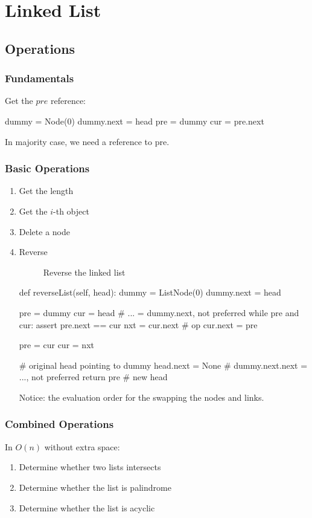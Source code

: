 \chapter{Linked List}


\section{Operations}
\subsection{Fundamentals}
Get the $pre$ reference:
\begin{python}
dummy = Node(0)
dummy.next = head
pre = dummy
cur = pre.next
\end{python}

In majority case, we need a reference to pre.

\subsection{Basic Operations}
\begin{enumerate}
\item Get the length
\item Get the $i$-th object
\item Delete a node 
\item Reverse
\begin{figure}[]
\centering
{}
\caption{Reverse the linked list}
\label{fig:LABEL}
\end{figure}
\begin{python}
def reverseList(self, head):
    dummy = ListNode(0)
    dummy.next = head

    pre = dummy
    cur = head  # ... = dummy.next, not preferred
    while pre and cur:
        assert pre.next == cur
        nxt = cur.next
        # op
        cur.next = pre
        
        pre = cur
        cur = nxt
	
	# original head pointing to dummy
    head.next = None  # dummy.next.next = ..., not preferred
    return pre  # new head
\end{python}
Notice: the evaluation order for the swapping the nodes and links. 
\end{enumerate}

\subsection{Combined Operations}
In $O(n)$ without extra space:
\begin{enumerate}
\item Determine whether two lists intersects
\item Determine whether the list is palindrome 
\item Determine whether the list is acyclic
\end{enumerate}

